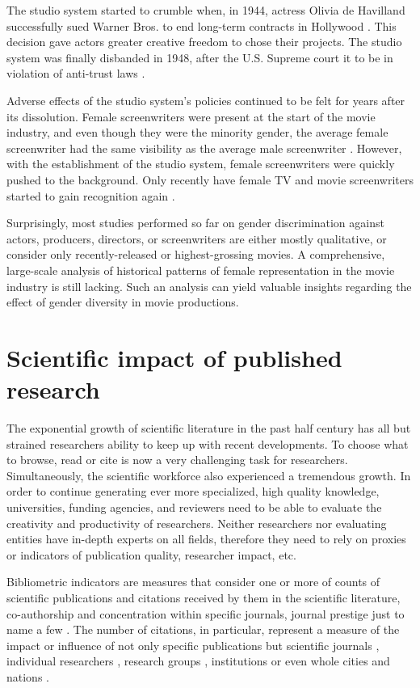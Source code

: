 The studio system started to crumble when, in 1944, actress Olivia de Havilland successfully sued Warner Bros. to end long-term contracts in Hollywood \cite{DeHaviland1944}. This decision gave actors greater creative freedom to chose their projects. The studio system was finally disbanded in 1948, after the U.S. Supreme court it to be in violation of anti-trust laws \cite{US1948}.

Adverse effects of the studio system's policies continued to be felt for years after its dissolution. Female screenwriters were present at the start of the movie industry, and even though they were the minority gender, the average female screenwriter had the same visibility as the average male screenwriter \cite{Smith-Doerr2010}. However, with the establishment of the studio system, female screenwriters were quickly pushed to the background. Only recently have female TV and movie screenwriters started to gain recognition again \cite{Bielby1996,Bielby2009}.

Surprisingly, most studies performed so far on gender discrimination against actors, producers, directors, or screenwriters are either mostly qualitative, or consider only recently-released or highest-grossing movies. A comprehensive, large-scale analysis of historical patterns of female representation in the movie industry is still lacking. Such an analysis can yield valuable insights regarding the effect of gender diversity in movie productions.


\section{Scientific impact of published research}

The exponential growth of scientific literature in the past half century has all but strained researchers ability to keep up with recent developments. To choose what to browse, read or cite is now a very challenging task for researchers. Simultaneously, the scientific workforce also experienced a tremendous growth. In order to continue generating ever more specialized, high quality knowledge, universities, funding agencies, and reviewers need to be able to evaluate the creativity and productivity of researchers. Neither researchers nor evaluating entities have in-depth experts on all fields, therefore they need to rely on proxies or indicators of publication quality, researcher impact, etc.

Bibliometric indicators are measures that consider one or more of counts of scientific publications and citations received by them in the scientific literature, co-authorship and concentration within specific journals, journal prestige just to name a few \cite{Narin1996,Borgman2002,Vinkler2004}. The number of citations, in particular, represent a measure of the impact or influence of not only specific publications but scientific journals \cite{Garfield1972}, individual researchers \cite{Hirsch2005, West2010}, research groups \cite{VanRaan2006a}, institutions \cite{Molinari2008,Bornmann2012,Abramo2013} or even whole cities and nations \cite{King2004,Mazloumian2013,Zhang2013}.

